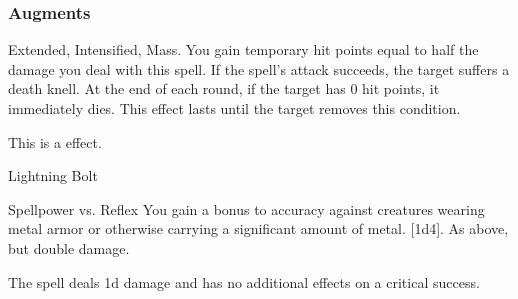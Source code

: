 \subsubsection{Augments}
 Extended, Intensified, Mass.
You gain temporary hit points equal to half the damage you deal with this spell.
If the spell's attack succeeds, the target suffers a death knell.
At the end of each round, if the target has 0 hit points, it immediately dies.
This effect lasts until the target removes this condition.
\par
This is a  effect.
\begin{spellsection}{Lightning Bolt}
\begin{spellheader}
\end{spellheader}
\begin{spellcontent}
\begin{spelltargetinginfo}
\end{spelltargetinginfo}
\begin{spelleffects}
\begin{spellattack}{Spellpower vs. Reflex}
\spellspecial You gain a  bonus to accuracy against creatures wearing metal armor or otherwise carrying a significant amount of metal.
\spellsuccess
{}[1d4].
\spellcritical As above, but double damage.
\end{spellattack}
\end{spelleffects}
\end{spellcontent}
\begin{spellfooter}
\miscastexplode
\end{spellfooter}
\begin{spellcantrip}
The spell deals \minus1d damage and has no additional effects on a critical success.
\end{spellcantrip}
\end{spellsection}
